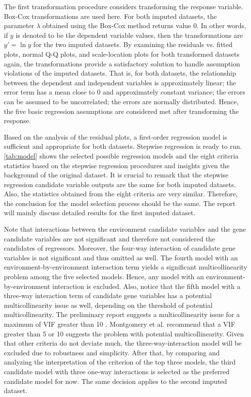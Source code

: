 \documentclass[11pt]{article}
\begin{document}
The first transformation procedure considers transforming the response variable. Box-Cox transformations are used here. For both imputed datasets, the parameter $\lambda$ obtained using the Box-Cox method returns value 0. In other words, if $y$ is denoted to be the dependent variable values, then the transformations are $y'=\ln{y}$ for the two imputed datasets. By examining the residuals vs. fitted plots, normal Q-Q plots, and scale-location plots for both transformed datasets again, the transformations provide a satisfactory solution to handle assumption violations of the imputed datasets. That is, for both datasets, the relationship between the dependent and independent variables is approximately linear; the error term has a mean close to 0 and approximately constant variance; the errors can be assumed to be uncorrelated; the errors are normally distributed. Hence, the five basic regression assumptions are considered met after transforming the response.

Based on the analysis of the residual plots, a first-order regression model is sufficient and appropriate for both datasets. Stepwise regression is ready to run. \autoref{tab:model} shows the selected possible regression models and the eight criteria statistics based on the stepwise regression procedures and insights given the background of the original dataset. It is crucial to remark that the stepwise regression candidate variable outputs are the same for both imputed datasets. Also, the statistics obtained from the eight criteria are very similar. Therefore, the conclusion for the model selection process should be the same. The report will mainly discuss detailed results for the first imputed dataset.



Note that interactions between the environment candidate variables and the gene candidate variables are not significant and therefore not considered the candidates of regressors. Moreover, the four-way interaction of candidate gene variables is not significant and thus omitted as well. The fourth model with an environment-by-environment interaction term yields a significant multicollinearity problem among the five selected models. Hence, any model with an environment-by-environment interaction is excluded. Also, notice that the fifth model with a three-way interaction term of candidate gene variables has a potential multicollinearity issue as well, depending on the threshold of potential multicollinearity. The preliminary report suggests a multicollinearity issue for a maximum of VIF greater than 10 \cite{bk:kutner}. Montgomery et al. \cite{bk:montgomery} recommend that a VIF greater than 5 or 10 suggests the problem with potential multicollinearity. Given that other criteria do not deviate much, the three-way-interaction model will be excluded due to robustness and simplicity. After that, by comparing and analyzing the interpretation of the criterion of the top three models, the third candidate model with three one-way interactions is selected as the preferred candidate model for now. The same decision applies to the second imputed dataset.
\end{document}
